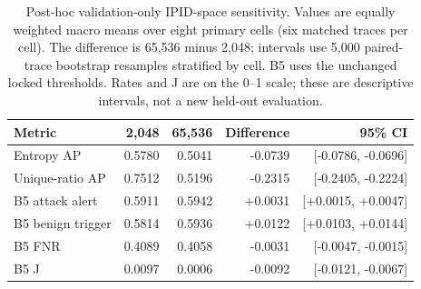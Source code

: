 \begin{table}[t]
\centering
\caption{Post-hoc validation-only IPID-space sensitivity. Values are equally weighted macro means over eight primary cells (six matched traces per cell). The difference is 65,536 minus 2,048; intervals use 5,000 paired-trace bootstrap resamples stratified by cell. B5 uses the unchanged locked thresholds. Rates and J are on the 0--1 scale; these are descriptive intervals, not a new held-out evaluation.}
\label{tab:ipid-space}
\begingroup\fontsize{9}{10.8}\selectfont
\setlength{\tabcolsep}{2pt}
\begin{tabular}{lrrrr}
\hline
Metric & 2,048 & 65,536 & Difference & 95\% CI \\
\hline
Entropy AP & 0.5780 & 0.5041 & -0.0739 & [-0.0786, -0.0696] \\
Unique-ratio AP & 0.7512 & 0.5196 & -0.2315 & [-0.2405, -0.2224] \\
B5 attack alert & 0.5911 & 0.5942 & +0.0031 & [+0.0015, +0.0047] \\
B5 benign trigger & 0.5814 & 0.5936 & +0.0122 & [+0.0103, +0.0144] \\
B5 FNR & 0.4089 & 0.4058 & -0.0031 & [-0.0047, -0.0015] \\
B5 J & 0.0097 & 0.0006 & -0.0092 & [-0.0121, -0.0067] \\
\hline
\end{tabular}
\endgroup
\end{table}
